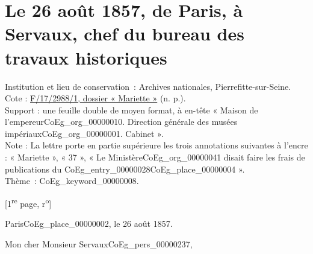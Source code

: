 \documentclass{book}
\begin{document}
{\section*{Le 26 août 1857, de Paris, à Servaux, chef du bureau des travaux historiques}
 \label{labCoEg_Mariette_1857-08-26}
{\footnotesize
\noindent Institution et lieu de conservation~: Archives nationales, Pierrefitte-sur-Seine.\\
Cote : \hyperlink{CoEg_Mariette_ms_002}{F/17/2988/1, dossier « Mariette »} (n. p.).\\
Support : une feuille double de moyen format, à en-tête « Maison de l’empereur\gls{CoEg_org_00000010}. Direction générale des musées impériaux\gls{CoEg_org_00000001}. Cabinet ».\\
Note : La lettre porte en partie supérieure les trois annotations suivantes à l’encre : « Mariette », « 37 », « Le Ministère\gls{CoEg_org_00000041} disait faire les frais de publications du \gls{CoEg_entry_00000028}\gls{CoEg_place_00000004} ».\\
Thème~: \gls{CoEg_keyword_00000008}.}

{\footnotesize\begin{center} {[1\textsuperscript{re} page, r\textsuperscript{o}]}\end{center}}
\begin{flushright}Paris\gls{CoEg_place_00000002}, le 26 août 1857.\end{flushright}

\hspace{1cm} Mon cher Monsieur Servaux\gls{CoEg_pers_00000237},\\

}
\end{document}
